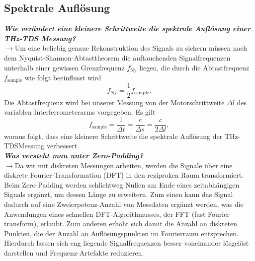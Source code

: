 \subsection{\label{subsec:FZV5}Spektrale Auflösung}
\textbf{\textit{Wie verändert eine kleinere Schrittweite die spektrale Auflösung einer THz-TDS Messung?}}\\
$\rightarrow$Um eine beliebig genaue Rekonstruktion des Signals zu sichern 
müssen nach dem Nyquist-Shannon-Abtasttheorem die auftauchenden Signalfrequenzen 
unterhalb einer gewissen Grenzfrequenz $f_{\text{Ny}}$ liegen, die durch die 
Abtastfrequenz $f_\text{sample}$ wie folgt beeinflusst wird
\begin{equation}
    f_{\text{Ny}} = \frac{1}{2}f_\text{sample}.
\end{equation}
Die Abtastfrequenz wird bei unserer Messung von der Motorschrittweite $\Delta l$ des variablen 
Interferrometerarms vorgegeben. Es gilt
\begin{equation}
    f_\text{sample} = \frac{1}{\Delta t} = \frac{c}{\Delta s} = \frac{c}{2\Delta l},
\end{equation}
woraus folgt, dass eine kleinere Schrittweite die spektrale Auflösung der THz-TDSMessung
verbessert. \\

\textbf{\textit{Was versteht man unter \glqq Zero-Padding\grqq{}?}}\\
$\rightarrow$Da wir mit diskreten Messungen arbeiten, werden die Signale über eine
diskrete Fourier-Transformation (DFT) in den reziproken Raum transformiert. 
Beim Zero-Padding werden schlichtweg Nullen am Ende eines zeitabhängigen Signals ergänzt, 
um dessen Länge zu erweitern. Zum einen kann das Signal dadurch auf eine Zweierpotenz-Anzahl 
von Messdaten ergänzt werden, was die Anwendungen eines schnellen DFT-Algorithmusses, der 
FFT (fast Fourier transform), erlaubt. Zum anderen erhöht sich damit die Anzahl an diskreten Punkten, 
die der Anzahl an Auflösungspunkten im Fourierraum entsprechen.
Hierdurch lassen sich eng liegende Signalfrequenzen besser voneinander lösgelöst darstellen und 
Frequenz-Artefakte reduzieren. 

